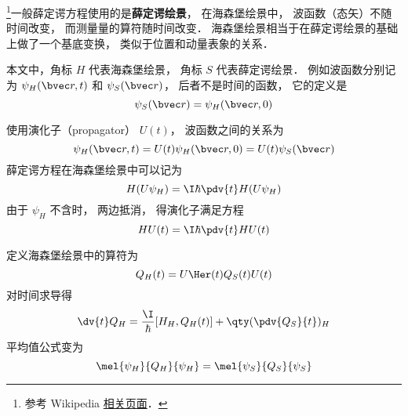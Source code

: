 
\begin{issues}
\issueDraft
\end{issues}


\footnote{参考 Wikipedia \href{https://en.wikipedia.org/wiki/Heisenberg_picture}{相关页面}．}一般薛定谔方程使用的是\textbf{薛定谔绘景}， 在海森堡绘景中， 波函数（态矢）不随时间改变， 而测量量的算符随时间改变． 海森堡绘景相当于在薛定谔绘景的基础上做了一个基底变换， 类似于位置和动量表象的关系．

本文中，角标 $H$ 代表海森堡绘景， 角标 $S$ 代表薛定谔绘景． 例如波函数分别记为 $\psi_H(\bvec r, t)$ 和 $\psi_S(\bvec r)$， 后者不是时间的函数， 它的定义是
\begin{equation}
\psi_S(\bvec r) = \psi_H(\bvec r, 0)
\end{equation}


使用演化子（propagator） $U(t)$， 波函数之间的关系为
\begin{equation}
\psi_H(\bvec r, t) = U(t) \psi_H(\bvec r, 0) = U(t) \psi_S(\bvec r)
\end{equation}
薛定谔方程在海森堡绘景中可以记为
\begin{equation}
H(U\psi_H) = \I\hbar \pdv{t} H(U\psi_H)
\end{equation}
由于 $\psi_H$ 不含时， 两边抵消， 得演化子满足方程
\begin{equation}
H U(t) = \I\hbar \pdv{t} H U(t)
\end{equation}

定义海森堡绘景中的算符为
\begin{equation}
Q_H(t) = U\Her(t) Q_S(t) U(t)
\end{equation}
对时间求导得
\begin{equation}
\dv{t}Q_H = \frac{\I}{\hbar} [H_H, Q_H(t)] + \qty(\pdv{Q_S}{t})_H
\end{equation}
平均值公式变为
\begin{equation}
\mel{\psi_H}{Q_H}{\psi_H} = \mel{\psi_S}{Q_S}{\psi_S}
\end{equation}
